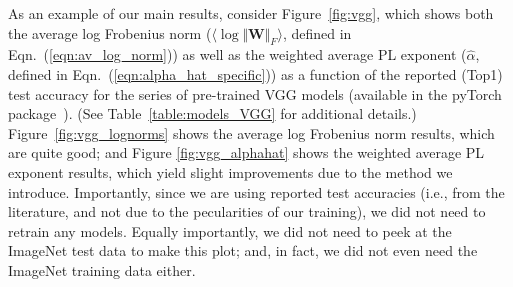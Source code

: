 As an example of our main results, consider Figure~\ref{fig:vgg}, which shows both the average log Frobenius norm 
($\langle\log\Vert\mathbf{W}\Vert_{F}\rangle$, defined in Eqn.~(\ref{eqn:av_log_norm}))
as well as the weighted average PL exponent ($\hat{\alpha}$, defined in Eqn.~(\ref{eqn:alpha_hat_specific}))
as a function of the reported (Top1) test accuracy for the series of pre-trained VGG models (available in the pyTorch package~\cite{pyTorch}).
(See Table~\ref{table:models_VGG} for additional details.)
Figure~\ref{fig:vgg_lognorms} shows the average log Frobenius norm results, which are quite good; and 
Figure \ref{fig:vgg_alphahat} shows the weighted average PL exponent results, which yield slight improvements due to the method we introduce.
Importantly, since we are using reported test accuracies (i.e., from the literature, and not due to the pecularities of our training), we did not need to retrain any models.
Equally importantly, we did not need to peek at the ImageNet test data to make this plot; and, in fact, we did not even need the ImageNet training data either.  


